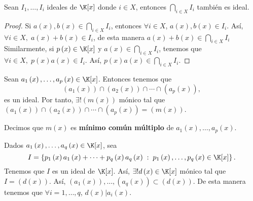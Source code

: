 \begin{fprop}[]
\normalfont Sean $\displaystyle I_{1}, \ldots, I_{i} $ ideales de $\displaystyle \K[x] $ donde $\displaystyle i \in X $, entonces $\displaystyle \bigcap_{i \in X}I_{i}  $ también es ideal.
\end{fprop}

\begin{proof}
Si $\displaystyle a\left(x\right),b\left(x\right) \in \bigcap_{i \in X}I_{i} $, entonces $\displaystyle \forall i \in X $, $\displaystyle a\left(x\right), b\left(x\right) \in I_{i} $. Así, $ \displaystyle \forall i \in X, \; a\left(x\right) + b\left(x\right) \in I_{i} $, de esta manera $ \displaystyle a\left(x\right) + b\left(x\right) \in \bigcap_{i \in X}I_{i}$
Similarmente, si $\displaystyle p\left(x\right)\in \K[x] $ y $\displaystyle a\left(x\right) \in \bigcap_{i \in X}I_{i} $, tenemos que $\displaystyle \forall i \in X, \; p\left(x\right)a\left(x\right) \in I_{i} $. Así, $\displaystyle p\left(x\right)a\left(x\right) \in \bigcap_{i \in X}I_{i} $.
\end{proof}
Sean $\displaystyle a_{1}\left(x\right), \ldots, a_{p}\left(x\right) \in \K[x]$. Entonces tenemos que 
\[\left(a_{1}\left(x\right)\right) \cap \left(a_{2}\left(x\right)\right) \cap\cdots \cap \left(a_{p}\left(x\right)\right) ,\]
es un ideal. Por tanto, $\displaystyle \exists!\left(m\left(x\right)\right) $ mónico tal que $\displaystyle \left(a_{1}\left(x\right)\right) \cap \left(a_{2}\left(x\right)\right) \cap\cdots \cap \left(a_{p}\left(x\right)\right) = \left(m\left(x\right)\right) $. 
\begin{fdefinition}
\normalfont Decimos que $\displaystyle m\left(x\right) $ es \textbf{mínimo común múltiplo} de $\displaystyle a_{1}\left(x\right), \ldots, a_{p}\left(x\right) $.
\end{fdefinition}
Dados $\displaystyle a_{1}\left(x\right), \ldots, a_{q} \left(x\right) \in \K[x]$, sea 
\[I = \left\{ p_{1}\left(x\right)a_{1}\left(x\right) + \cdots + p_{q}\left(x\right)a_{q}\left(x\right) \; : \; p_{1}\left(x\right), \ldots, p_{q}\left(x\right) \in \K[x]\right\}  .\]
Tenemos que $\displaystyle I $ es un ideal de $\displaystyle \K[x] $. Así, $\displaystyle \exists !d\left(x\right) \in \K[x] $ mónico tal que $\displaystyle I = \left(d\left(x\right)\right) $. Así, $\displaystyle \left(a_{1}\left(x\right)\right), \ldots, \left(a_{q}\left(x\right)\right) \subset \left(d\left(x\right)\right) $. De esta manera tenemos que $\displaystyle \forall i = 1, \ldots , q $, $\displaystyle d\left(x\right) | a_{i}\left(x\right) $. 
